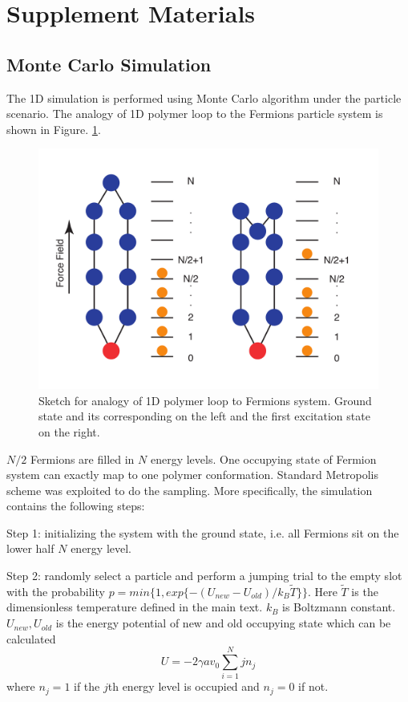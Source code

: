 \documentclass{article}
\begin{document}
\section{Supplement Materials}


\subsection{Monte Carlo Simulation}
\label{sub:MCS}
The 1D simulation is performed using Monte Carlo algorithm under the particle
scenario. The analogy of 1D polymer loop to the Fermions particle system is
shown in Figure. \ref{fig:s1}. 
\begin{figure}[htpb]
	\centering
	\includegraphics[width=0.8\linewidth]{figureS1}
	\caption{Sketch for analogy of 1D polymer loop to Fermions system.
		Ground state and its corresponding on the left and the first 
		excitation state on the right.}
	\label{fig:s1}
\end{figure}

$N/2$ Fermions are filled in $N$ energy levels. One occupying state of Fermion
system can exactly map to one polymer conformation. Standard Metropolis
scheme\cite{binder2010monte} was exploited to do the sampling. More specifically,
the simulation contains the following steps:

Step 1: initializing the system with the ground state, i.e. all Fermions sit on 
the lower half $N$ energy level. 

Step 2: randomly select a particle and perform a jumping trial to the empty
slot with the probability $p = min\{1,exp\{-(U_{new}-U_{old})/k_B \tilde T\}\}$.
Here $\tilde T$ is the dimensionless temperature defined in the main text. 
$k_B$ is Boltzmann constant. $U_{new}, U_{old}$ is the energy potential of new
and old occupying state which can be calculated
\begin{equation}
	U =  -2 \gamma a v_0\sum_{i=1}^N{jn_j}  
\end{equation}
where $n_j=1$ if the $j$th energy level is occupied and $n_j=0$ if not. 
\end{document}
